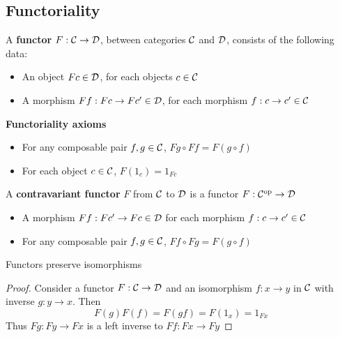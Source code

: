 \documentclass[11pt]{article}
\def \Cop {\calc^{\op}}
\begin{document}
\subsection{Functoriality}
\label{sec:orgc801b4c}
\begin{definition}[]
A \textbf{functor} \(F:\mathcal{C}\to\mathcal{D}\), between categories \(\mathcal{C}\) and \(\mathcal{D}\), consists of the following data:
\begin{itemize}
\item An object \(Fc\in\mathcal{D}\), for each objects \(c\in\mathcal{C}\)
\item A morphism \(Ff:Fc\to Fc'\in\mathcal{D}\), for each morphism \(f:c\to c'\in\mathcal{C}\)
\end{itemize}


\textbf{Functoriality axioms}
\begin{itemize}
\item For any composable pair \(f,g\in\mathcal{C}\), \(Fg\circ Ff=F(g\circ f)\)
\item For each object \(c\in\mathcal{C}\), \(F(1_c)=1_{Fc}\)
\end{itemize}
\end{definition}

\begin{definition}[]
A \textbf{contravariant functor} \(F\) from \(\mathcal{C}\) to \(\mathcal{D}\) is a functor \(F:\Cop\to\cald\)
\begin{itemize}
\item A morphism \(Ff:Fc'\to Fc\in\mathcal{D}\) for each morphism \(f:c\to c'\in\mathcal{C}\)
\item For any composable pair \(f,g\in\mathcal{C}\), \(Ff\circ Fg=F(g\circ f)\)
\end{itemize}
\end{definition}

\begin{center}\end{center}

\begin{lemma}[]
Functors preserve isomorphisms
\end{lemma}

\begin{proof}
Consider a functor \(F:\mathcal{C}\to\mathcal{D}\) and an isomorphism \(f:x\to y\) in \(\mathcal{C}\) with inverse \(g:y\to x\).
Then
\begin{equation*}
F(g)F(f)=F(gf)=F(1_x)=1_{Fx}
\end{equation*}
Thus \(Fg:Fy\to Fx\) is a left inverse to \(Ff:Fx\to Fy\)
\end{proof}
\end{document}

